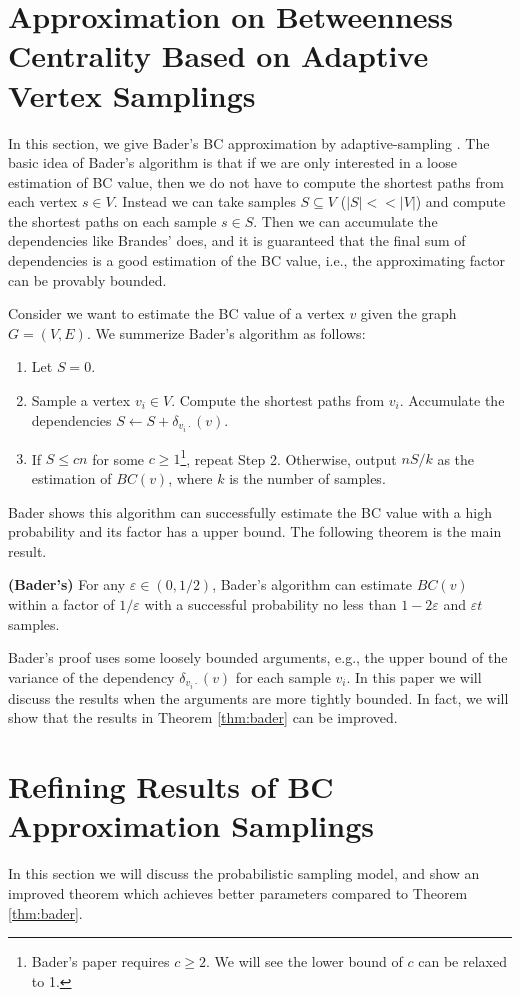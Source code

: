 \documentclass[10pt]{article}
\begin{document}
\section{Approximation on Betweenness Centrality Based on Adaptive Vertex Samplings}
In this section, we give Bader's BC approximation by adaptive-sampling \cite{bader2007approximating}. The basic idea of Bader's algorithm is that if we are only interested in a loose estimation of BC value, then we do not have to compute the shortest paths from each vertex $s\in V$. Instead we can take samples $S\subseteq V$ ($|S|<<|V|$) and compute the shortest paths on each sample $s\in S$. Then we can accumulate the dependencies like Brandes' does, and it is guaranteed that the final sum of dependencies is a good estimation of the BC value, i.e., the approximating factor can be provably bounded.

Consider we want to estimate the BC value of a vertex $v$ given the graph $G=(V,E)$. We summerize Bader's algorithm as follows:
\begin{enumerate}
\item Let $S=0$.
\item Sample a vertex $v_i\in V$. Compute the shortest paths from $v_i$. Accumulate the dependencies $S \gets S+ \delta_{v_i\cdot}(v)$.
\item If $S \leq cn$ for some $c\geq 1$\footnote{Bader's paper \cite{bader2007approximating} requires $c\geq 2$. We will see the lower bound of $c$ can be relaxed to 1.}, repeat Step 2. Otherwise, output $nS/k$ as the estimation of $BC(v)$, where $k$ is the number of samples.
\end{enumerate}
Bader shows this algorithm can successfully estimate the BC value with a high probability and its factor has a upper bound. The following theorem is the main result.
\begin{theorem}
\label{thm:bader}
{\bf (Bader's)} For any $\varepsilon \in (0,1/2)$, Bader's algorithm can estimate $BC(v)$ within a factor of $1/\varepsilon$ with a successful probability no less than $1-2\varepsilon$ and $\varepsilon t$ samples.
\end{theorem}
Bader's proof uses some loosely bounded arguments, e.g., the upper bound of the variance of the dependency $\delta_{v_i\cdot}(v)$ for each sample $v_i$. In this paper we will discuss the results when the arguments are more tightly bounded. In fact, we will show that the results in Theorem \ref{thm:bader} can be improved.

\section{Refining Results of BC Approximation Samplings}
In this section we will discuss the probabilistic sampling model, and show an improved theorem which achieves better parameters compared to Theorem \ref{thm:bader}.
\end{document}
